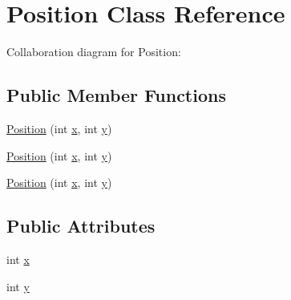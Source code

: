 \hypertarget{classPosition}{\section{Position Class Reference}
\label{classPosition}
}


Collaboration diagram for Position\-:
\subsection*{Public Member Functions}
\begin{DoxyCompactItemize}
\item 
\hyperlink{classPosition_a6e36cf0fee251e74cfedb86f4e99558d}{Position} (int \hyperlink{classPosition_aeda152ffeee17ae5be9c02327b2408d8}{x}, int \hyperlink{classPosition_a3c08e9213d4726b21caba3073192c4a3}{y})
\item 
\hyperlink{classPosition_a6e36cf0fee251e74cfedb86f4e99558d}{Position} (int \hyperlink{classPosition_aeda152ffeee17ae5be9c02327b2408d8}{x}, int \hyperlink{classPosition_a3c08e9213d4726b21caba3073192c4a3}{y})
\item 
\hyperlink{classPosition_a6e36cf0fee251e74cfedb86f4e99558d}{Position} (int \hyperlink{classPosition_aeda152ffeee17ae5be9c02327b2408d8}{x}, int \hyperlink{classPosition_a3c08e9213d4726b21caba3073192c4a3}{y})
\end{DoxyCompactItemize}
\subsection*{Public Attributes}
\begin{DoxyCompactItemize}
\item 
int \hyperlink{classPosition_aeda152ffeee17ae5be9c02327b2408d8}{x}
\item 
int \hyperlink{classPosition_a3c08e9213d4726b21caba3073192c4a3}{y}
\end{DoxyCompactItemize}


